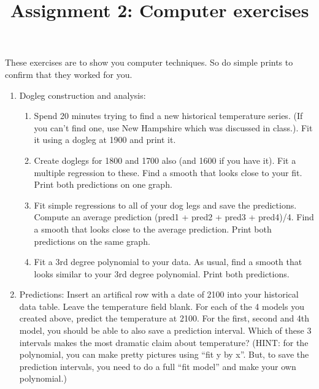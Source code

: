\documentclass[11pt]{article}
\begin{document}
\title{Assignment 2: Computer exercises}

These exercises are to show you computer techniques.  So do simple
 prints to confirm that they worked for you.

\begin{enumerate}
\item Dogleg construction and analysis:
\begin{enumerate}
\item Spend 20 minutes trying to find a new historical temperature
series.  (If you can't find one, use New Hampshire which was discussed
in class.).   Fit it using a dogleg at 1900 and print it.
\item Create doglegs for 1800 and 1700 also (and 1600 if you have
it).  Fit a multiple regression to these.  Find a smooth that looks
close to your fit.  Print both predictions on one graph. 
\item Fit simple regressions to all of your dog legs and save the
predictions.  Compute an average prediction (pred1 + pred2 + pred3 +
pred4)/4.  Find a smooth that looks close to the average prediction.
Print both predictions on the same graph.
\item Fit a 3rd degree polynomial to your data.  As usual, find a
smooth that looks similar to your 3rd degree polynomial.  Print both
predictions. 
\end{enumerate}

\item Predictions: Insert an artifical row with a date of 2100 into
your historical data table.  Leave the temperature field blank.  For
each of the 4 models you created above, predict the temperature at
2100.   For the first, second and 4th model, you should be able to
also save a prediction interval.  Which of these 3 intervals makes the
most dramatic claim about temperature?  (HINT: for the polynomial, you
can make pretty pictures using ``fit y by x''.  But, to save the
prediction intervals, you need to do a full ``fit model'' and make
your own polynomial.)


\end{enumerate}
\end{document}
